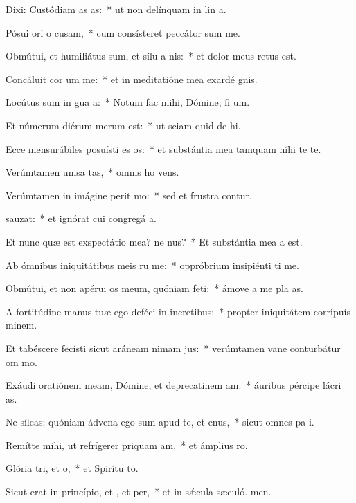 \item Dixi: Custódiam as as:~* ut non delínquam in lin a.
\item Pósui ori o cusam,~* cum consísteret peccátor sum me.
\item Obmútui, et humiliátus sum, et sílu a nis:~* et dolor meus retus est.
\item Concáluit cor um  me:~* et in meditatióne mea exardé gnis.
\item Locútus sum in gua a:~* Notum fac mihi, Dómine, fi um.
\item Et númerum diérum merum  est:~* ut sciam quid de hi.
\item Ecce mensurábiles posuísti es os:~* et substántia mea tamquam níhi te te.
\item Verúmtamen unisa tas,~* omnis ho vens.
\item Verúmtamen in imágine perit mo:~* sed et frustra contur.
\item {}sauzat:~* et ignórat cui congregá a.
\item Et nunc quæ est exspectátio mea? ne nus?~* Et substántia mea a  est.
\item Ab ómnibus iniquitátibus meis ru me:~* oppróbrium insipiénti ti me.
\item Obmútui, et non apérui os meum, quóniam  feti:~* ámove a me pla as.
\item A fortitúdine manus tuæ ego deféci in incretibus:~* propter iniquitátem corripuís minem.
\item Et tabéscere fecísti sicut aráneam nimam jus:~* verúmtamen vane conturbátur om mo.
\item Exáudi oratiónem meam, Dómine, et deprecatinem am:~* áuribus pércipe lácri as.
\item Ne síleas: quóniam ádvena ego sum apud te, et enus,~* sicut omnes pa i.
\item Remítte mihi, ut refrígerer priquam am,~* et ámplius  ro.
\item Glória tri, et o,~* et Spirítu to.
\item Sicut erat in princípio, et , et per,~* et in sǽcula sæculó. men.
